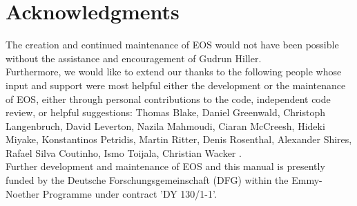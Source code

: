 \chapter*{Acknowledgments}

The creation and continued maintenance of EOS would not have been possible without
the assistance and encouragement of Gudrun Hiller.\\

Furthermore, we would like to extend our thanks to the following people
whose input and support were most helpful either the development or the
maintenance of EOS, either through personal contributions to the code,
independent code review, or helpful suggestions:
Thomas Blake,
Daniel Greenwald,
Christoph Langenbruch,
David Leverton,
Nazila Mahmoudi,
Ciaran McCreesh,
Hideki Miyake,
Konstantinos Petridis,
Martin Ritter,
Denis Rosenthal,
Alexander Shires,
Rafael Silva Coutinho,
Ismo Toijala,
Christian Wacker
.\\

Further development and maintenance of EOS and this manual is presently funded by the
Deutsche Forschungsgemeinschaft (DFG) within the Emmy-Noether Programme under contract
'DY 130/1-1'.
